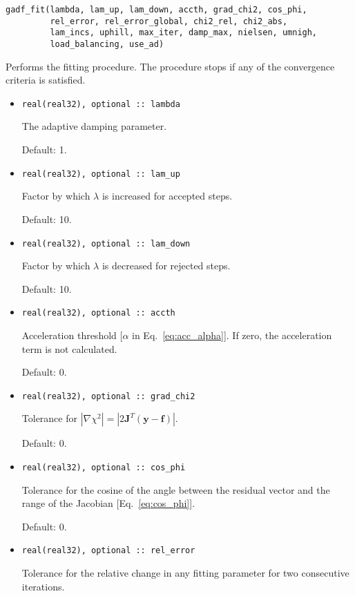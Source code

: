 \documentclass{article}
\begin{document}
\begin{verbatim}
gadf_fit(lambda, lam_up, lam_down, accth, grad_chi2, cos_phi,
         rel_error, rel_error_global, chi2_rel, chi2_abs,
         lam_incs, uphill, max_iter, damp_max, nielsen, umnigh,
         load_balancing, use_ad)
\end{verbatim}
Performs the fitting procedure. The procedure stops if any of the convergence criteria is satisfied.
\begin{itemize}
\item
\begin{verbatim}
real(real32), optional :: lambda
\end{verbatim}
  The adaptive damping parameter.

  Default: 1.
\item
\begin{verbatim}
real(real32), optional :: lam_up
\end{verbatim}
  Factor by which $\lambda$ is increased for accepted steps.

  Default: 10.
\item
\begin{verbatim}
real(real32), optional :: lam_down
\end{verbatim}
  Factor by which $\lambda$ is decreased for rejected steps.

  Default: 10.
\item
\begin{verbatim}
real(real32), optional :: accth
\end{verbatim}
  Acceleration threshold [$\alpha$ in Eq.~\eqref{eq:acc_alpha}]. If zero, the acceleration term is not calculated.

  Default: 0.
\item
\begin{verbatim}
real(real32), optional :: grad_chi2
\end{verbatim}
  Tolerance for $|\nabla \chi^2| = |2\bm J^T (\bm y - \bm f)|$.

  Default: 0.
\item
\begin{verbatim}
real(real32), optional :: cos_phi
\end{verbatim}
  Tolerance for the cosine of the angle between the residual vector and the range of the Jacobian [Eq.~\eqref{eq:cos_phi}].

  Default: 0.
\item
\begin{verbatim}
real(real32), optional :: rel_error
\end{verbatim}
  Tolerance for the relative change in any fitting parameter for two consecutive iterations.


\end{itemize}
\end{document}
